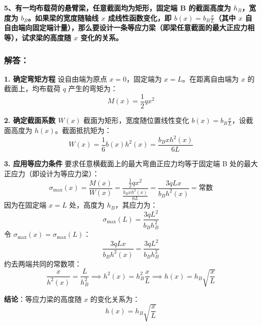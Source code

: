 \documentclass[11pt,a4paper]{ctexrep}
\begin{document}
{\textbf{5、有一均布载荷的悬臂梁，任意截面均为矩形，固定端 B 的截面高度为 $h_B$，宽度为 $b_B$。如果梁的宽度随轴线 $x$ 成线性函数变化，即 $b(x) = b_B \frac{x}{L}$（其中 $x$ 自自由端向固定端计量），那么要设计一条等应力梁（即梁任意截面的最大正应力相等），试求梁的高度随 $x$ 变化的关系。}

\subsubsection*{解答：}

\textbf{1. 确定弯矩方程}
设自由端为原点 $x = 0$，固定端为 $x = L$。在距离自由端为 $x$ 的截面上，均布载荷 $q$ 产生的弯矩为：
\[
    M(x) = \frac{1}{2} q x^2
\]

\textbf{2. 确定截面系数 $W(x)$}
截面为矩形，宽度随位置线性变化 $b(x) = b_B \frac{x}{L}$，设截面高度为 $h(x)$。截面抵抗矩为：
\[
    W(x) = \frac{1}{6} b(x) h^2(x) = \frac{b_B x h^2(x)}{6 L}
\]

\textbf{3. 应用等应力条件}
要求任意横截面上的最大弯曲正应力均等于固定端 B 处的最大正应力（即设计为等应力梁）：
\[
    \sigma_{\max}(x) = \frac{M(x)}{W(x)} = \frac{\frac{1}{2} q x^2}{\frac{b_B x h^2(x)}{6 L}} = \frac{3 q L x}{b_B h^2(x)} = \text{常数}
\]
因为在固定端 $x = L$ 处，高度为 $h_B$，其应力为：
\[
    \sigma_{\max}(L) = \frac{3 q L^2}{b_B h_B^2}
\]
令 $\sigma_{\max}(x) = \sigma_{\max}(L)$：
\[
    \frac{3 q L x}{b_B h^2(x)} = \frac{3 q L^2}{b_B h_B^2}
\]
约去两端共同的常数项：
\[
    \frac{x}{h^2(x)} = \frac{L}{h_B^2} \implies h^2(x) = h_B^2 \frac{x}{L} \implies h(x) = h_B \sqrt{\frac{x}{L}}
\]

\textbf{结论}：等应力梁的高度随 $x$ 的变化关系为：
\[
    h(x) = h_B \sqrt{\frac{x}{L}}
\]


}
\end{document}
